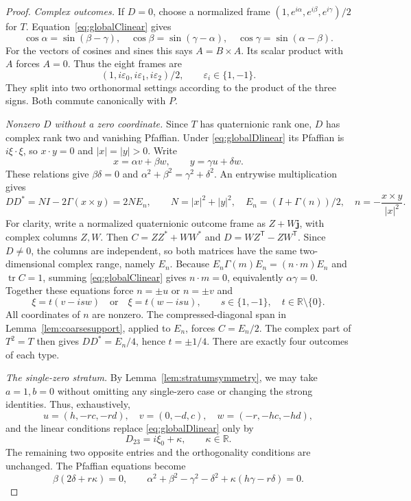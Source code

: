 \documentclass[11pt]{article}
\begin{document}
\begin{proof}
\emph{Complex outcomes.} If $D=0$, choose a normalized frame
$(1,e^{i\alpha},e^{i\beta},e^{i\gamma})/2$ for $T$.
Equation~\eqref{eq:globalClinear} gives
\[
 \cos\alpha=\sin(\beta-\gamma),\quad
 \cos\beta=\sin(\gamma-\alpha),\quad
 \cos\gamma=\sin(\alpha-\beta).
\]
For the vectors of cosines and sines this says $A=B\times A$.
Its scalar product with $A$ forces $A=0$. Thus the eight frames are
\begin{equation}\label{eq:globaleightcomplex}
 (1,i\varepsilon_0,i\varepsilon_1,i\varepsilon_2)/2,
 \qquad \varepsilon_i\in\{1,-1\}.
\end{equation}
They split into two orthonormal settings according to the product of
the three signs. Both commute canonically with $P$.

\emph{Nonzero $D$ without a zero coordinate.}
Since $T$ has quaternionic rank one, $D$ has complex rank two and
vanishing Pfaffian. Under \eqref{eq:globalDlinear} its Pfaffian is
$i\xi\cdot\xi$, so $x\cdot y=0$ and $|x|=|y|>0$.
Write
\[
 x=\alpha v+\beta w,\qquad y=\gamma u+\delta w.
\]
These relations give $\beta\delta=0$ and
$\alpha^2+\beta^2=\gamma^2+\delta^2$.
An entrywise multiplication gives
\[
 DD^*=N I-2\Gamma(x\times y)=2N E_n,\qquad
 N=|x|^2+|y|^2,\quad E_n=(I+\Gamma(n))/2,
 \quad n=-\frac{x\times y}{|x|^2}.
\]
For clarity, write a normalized quaternionic outcome frame as
$Z+W\mathbf j$, with complex columns $Z,W$. Then
$C=ZZ^*+WW^*$ and $D=WZ^{\mathsf T}-ZW^{\mathsf T}$.
Since $D\ne0$, the columns are independent, so both matrices have the
same two-dimensional complex range, namely $E_n$.
Because $E_n\Gamma(m)E_n=(n\cdot m)E_n$ and
$\operatorname{tr}C=1$, summing \eqref{eq:globalClinear} gives
$n\cdot m=0$, equivalently $\alpha\gamma=0$.
Together these equations force $n=\pm u$ or $n=\pm v$ and
\[
 \xi=t(v-isw)\quad\text{or}\quad \xi=t(w-isu),
 \qquad s\in\{1,-1\},\quad t\in\mathbb R\setminus\{0\}.
\]
All coordinates of $n$ are nonzero. The compressed-diagonal span in
Lemma~\ref{lem:coarsesupport}, applied to $E_n$, forces $C=E_n/2$.
The complex part of $T^2=T$ then gives $DD^*=E_n/4$, hence $t=\pm1/4$.
There are exactly four outcomes of each type.

\emph{The single-zero stratum.}
By Lemma~\ref{lem:stratumsymmetry}, we may take $a=1,b=0$
without omitting any single-zero case or changing the strong identities.
Thus, exhaustively,
\[
 u=(h,-rc,-rd),\quad v=(0,-d,c),\quad w=(-r,-hc,-hd),
\]
and the linear conditions replace \eqref{eq:globalDlinear} only by
\[
 D_{23}=i\xi_0+\kappa,\qquad \kappa\in\mathbb R.
\]
The remaining two opposite entries and the orthogonality conditions
are unchanged. The Pfaffian equations become
\begin{equation}\label{eq:globalexceptioncone}
 \beta(2\delta+r\kappa)=0,\qquad
 \alpha^2+\beta^2-\gamma^2-\delta^2
       +\kappa(h\gamma-r\delta)=0.
\end{equation}


\end{proof}
\end{document}

